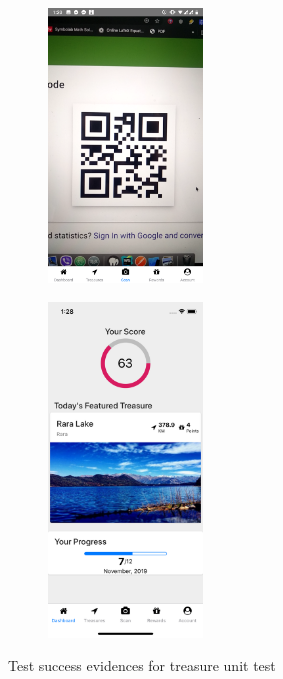 \documentclass[12pt, a4paper, oneside]{article}
\begin{document}
\begin{figure}[H]
\begin{subfigure}{.5\textwidth}
    \centering
    \includegraphics[width=0.45\textwidth]{test-evidences/treasure/e.png}
    \caption{}
\end{subfigure}%
\begin{subfigure}{.5\textwidth}
    \centering
    \includegraphics[width=0.45\textwidth]{test-evidences/treasure/f.png}
    \caption{}
\end{subfigure}


\caption{Test success evidences for treasure unit test}
\label{fig:test-evidence-treasure}
\end{figure}
\end{document}
